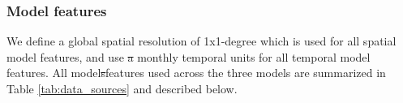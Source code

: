 \documentclass[lineno,pdflatex,sn-nature]{sn-jnl}
\makeatletter
\providecommand{\DIFdel}[1]{{\protect\color{red}\sout{#1}}} %
\providecommand{\DIFdelbegin}{} %
\providecommand{\DIFdelend}{} %
\providecommand{\DIFdelbeginFL}{} %
\providecommand{\DIFscaledelfig}{0.5}
\newlength{\DIFdelgraphicswidth} %
\newlength{\DIFdelgraphicsheight} %
\providecommand{\DIFdelincludegraphics}[2][]{%
\sbox{\DIFdelgraphicsbox}{\DIFOincludegraphics[#1]{#2}}%
\settoboxwidth{\DIFdelgraphicswidth}{\DIFdelgraphicsbox} %
\settoboxtotalheight{\DIFdelgraphicsheight}{\DIFdelgraphicsbox} %
\scalebox{\DIFscaledelfig}{%
\parbox[b]{\DIFdelgraphicswidth}{\usebox{\DIFdelgraphicsbox}\\[-\baselineskip] \rule{\DIFdelgraphicswidth}{0em}}\llap{\resizebox{\DIFdelgraphicswidth}{\DIFdelgraphicsheight}{%
\setlength{\unitlength}{\DIFdelgraphicswidth}%
\begin{picture}(1,1)%
\thicklines\linethickness{2pt} %
{\color[rgb]{1,0,0}\put(0,0){\framebox(1,1){}}}%
{\color[rgb]{1,0,0}\put(0,0){\line( 1,1){1}}}%
{\color[rgb]{1,0,0}\put(0,1){\line(1,-1){1}}}%
\end{picture}%
}\hspace*{3pt}}} %
} %
\DeclareRobustCommand{\DIFdelbegin}{\DIFOdelbegin \let\includegraphics\DIFdelincludegraphics} %
\DeclareRobustCommand{\DIFdelend}{\DIFOaddend \let\includegraphics\DIFOincludegraphics} %
\DeclareRobustCommand{\DIFdelbeginFL}{\DIFOdelbeginFL \let\includegraphics\DIFdelincludegraphics} %
\let\sout@orig\sout %
\renewcommand{\sout}[1]{\ifmmode\text{\sout@orig{\ensuremath{#1}}}\else\sout@orig{#1}\fi} %
\makeatother
\begin{document}
\subsubsection{Model features}

We define a global spatial resolution of 1x1-degree which is used for all spatial model features, and use \DIFdelbegin \DIFdel{a }\DIFdelend monthly temporal units for all temporal model features. All model\DIFdelbegin \DIFdel{s}\DIFdelend  features used across the three models are summarized in Table \ref{tab:data_sources} and described below.

\clearpage

\begin{table}[!h]
\centering
\caption{\label{tab:data_sources}Data sources for all included model features, including which random forest model uses the features (M1: detections classification; M2: detections regression; and/or M3: emissions regression), the units, feature type, whether it varies spatially, whether it varies temporally, and the source name and reference citation.}
\centering
\fontsize{4}{6}\selectfont
\DIFdelbeginFL %

\end{table}
\end{document}
